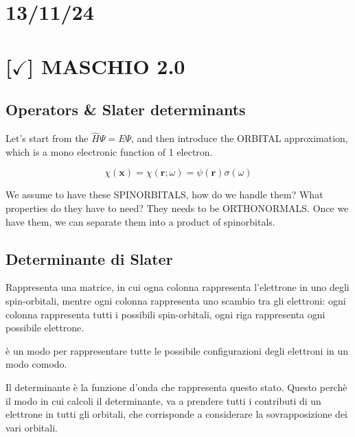 \section{13/11/24}

\section{[$\checkmark$] MASCHIO 2.0}

\subsection{Operators \& Slater determinants}

Let's start from the $\hat{H}\Psi = E \Psi$, and then introduce the ORBITAL approximation, which is a mono electronic function of 1 electron.

$$\chi (\mathbf{x}) = \chi(\mathbf{r};\omega) = \psi(\mathbf{r}) \sigma(\omega)$$

We assume to have these SPINORBITALS, how do we handle them? What properties do they have to need? They needs to be ORTHONORMALS. Once we have them, we can separate them into a product of spinorbitals.

\subsection{Determinante di Slater}

Rappresenta una matrice, in cui ogna colonna rappresenta l'elettrone in uno degli spin-orbitali, mentre ogni colonna rappresenta uno scambio tra gli elettroni: ogni colonna rappresenta tutti i possibili spin-orbitali, ogni riga rappresenta ogni possibile elettrone.

è un modo per rappresentare tutte le possibile configurazioni degli elettroni in un modo comodo.

Il determinante è la funzione d'onda che rappresenta questo stato. Questo perchè il modo in cui calcoli il determinante, va a prendere tutti i contributi di un elettrone in tutti gli orbitali, che corrisponde a considerare la sovrapposizione dei vari orbitali.
